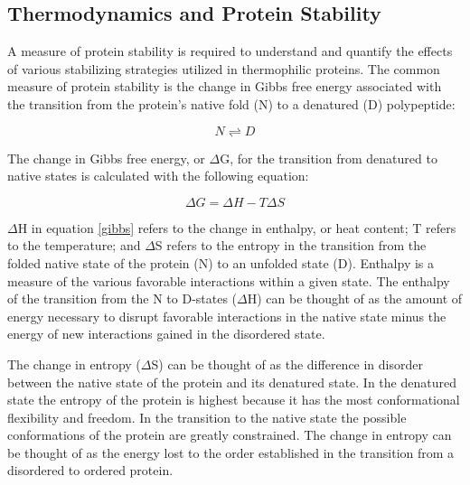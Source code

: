 \subsection{Thermodynamics and Protein Stability}

A measure of protein stability is required to understand and quantify the
effects of various stabilizing strategies utilized in thermophilic proteins.
The common measure of protein stability is the change in Gibbs free energy
associated with the transition from the protein's native fold (N) to a
denatured (D) polypeptide:  

\begin{equation}\label{equ}
  N \rightleftharpoons D
\end{equation}

The change in Gibbs free energy, or $\Delta$G, for the transition from denatured
to native states is calculated with the following equation:

\begin{equation}\label{gibbs}
  \Delta G = \Delta H - T \Delta S
\end{equation}

$\Delta$H in equation \eqref{gibbs} refers to the change in enthalpy, or heat
content; T refers to the temperature; and $\Delta$S refers to the entropy in
the transition from the folded native state of the protein (N) to an unfolded state
(D).  Enthalpy is a measure of the various favorable interactions within a
given state.  The enthalpy of the transition from the N to D-states ($\Delta$H)
can be thought of as the amount of energy necessary to disrupt favorable
interactions in the native state minus the energy of new interactions
gained in the disordered state.


The change in entropy ($\Delta$S) can be thought of as the difference in disorder between
the native state of the protein and its denatured state. In the denatured state
the entropy of the protein is highest because it has the most conformational
flexibility and freedom.  In the transition to the native state the possible
conformations of the protein are greatly constrained. The change in entropy can
be thought of as the energy lost to the order established in the transition
from a disordered to ordered protein.


